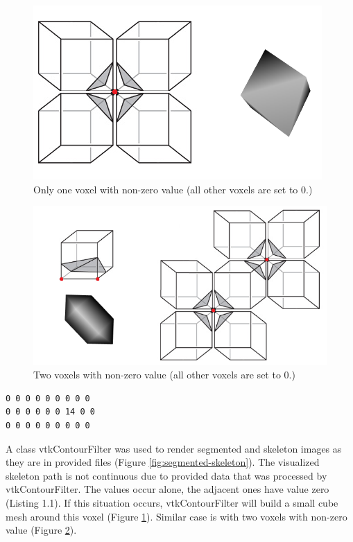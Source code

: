 \begin{figure}
	\centering
	\includegraphics[scale=0.6]{fig/marching-cubes-1-point}
	\caption{Only one voxel with non-zero value (all other voxels are set to 0.)}\label{fig:marching-cubes-1-point}
\end{figure}

\begin{figure}
	\centering
	\includegraphics[scale=0.6]{fig/marching-cubes-2-points}
	\caption{Two voxels with non-zero value (all other voxels are set to 0.)}\label{fig:marching-cubes-2-points}
\end{figure}

\begin{lstlisting}[caption={A sample from skeleton file},label={lst:sample-skeleton}]
0 0 0 0 0 0 0 0 0 
0 0 0 0 0 0 14 0 0 
0 0 0 0 0 0 0 0 0 
\end{lstlisting}

A class vtkContourFilter was used to render segmented and skeleton images as they are in provided files (Figure \ref{fig:segmented-skeleton}).
The visualized skeleton path is not continuous due to provided data that was processed by vtkContourFilter. The values occur alone, the adjacent ones have value zero (Listing 1.1). If this situation occurs, vtkContourFilter will build a small cube mesh around this voxel (Figure \ref{fig:marching-cubes-1-point}). Similar case is with two voxels with non-zero value (Figure \ref{fig:marching-cubes-2-points}).

